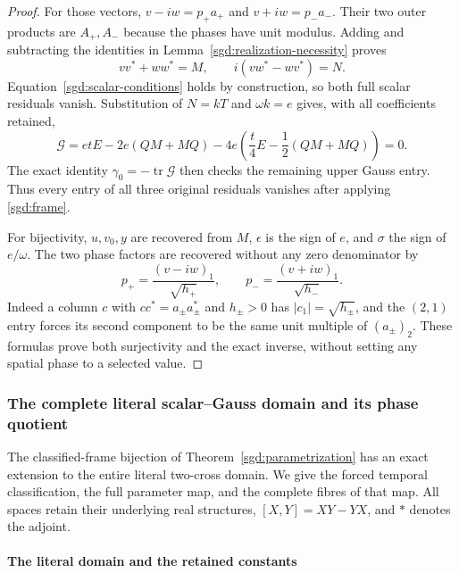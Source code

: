 \begin{proof}
For those vectors, $v-iw=p_+a_+$ and $v+iw=p_-a_-$.
Their two outer products are $A_+,A_-$ because the phases have unit
modulus. Adding and subtracting the identities in
Lemma~\ref{sgd:realization-necessity} proves
\[
 vv^*+ww^*=M,\qquad i(vw^*-wv^*)=N.
\]
Equation~\eqref{sgd:scalar-conditions} holds by construction, so both
full scalar residuals vanish. Substitution of $N=kT$ and
$\omega k=e$ gives, with all coefficients retained,
\[
 \mathcal G=etE-2e(QM+MQ)
        -4e\left(\frac t4E-\frac12(QM+MQ)\right)=0.
\]
The exact identity $\gamma_0=-\operatorname{tr}\mathcal G$ then checks the
remaining upper Gauss entry. Thus every entry of all three original
residuals vanishes after applying \eqref{sgd:frame}.

For bijectivity, $u,v_0,y$ are recovered from $M$, $\epsilon$ is
the sign of $e$, and $\sigma$ the sign of $e/\omega$. The two
phase factors are recovered without any zero denominator by
\[
 p_+=\frac{(v-iw)_1}{\sqrt{h_+}},\qquad
 p_-=\frac{(v+iw)_1}{\sqrt{h_-}}.
\]
Indeed a column $c$ with $cc^*=a_\pm a_\pm^*$ and $h_\pm>0$
has $|c_1|=\sqrt{h_\pm}$, and the $(2,1)$ entry forces its second
component to be the same unit multiple of $(a_\pm)_2$.
These formulas prove both surjectivity and the exact inverse, without
setting any spatial phase to a selected value.
\end{proof}

\subsubsection{The complete literal scalar--Gauss domain and its phase quotient}
\label{sgd:literal-addon:section}

The classified-frame bijection of Theorem~\ref{sgd:parametrization}
has an exact extension to the entire literal two-cross domain.
We give the forced temporal classification, the full parameter map,
and the complete fibres of that map. All spaces retain their underlying
real structures, $[X,Y]=XY-YX$, and $*$ denotes the adjoint.

\paragraph{The literal domain and the retained constants}

